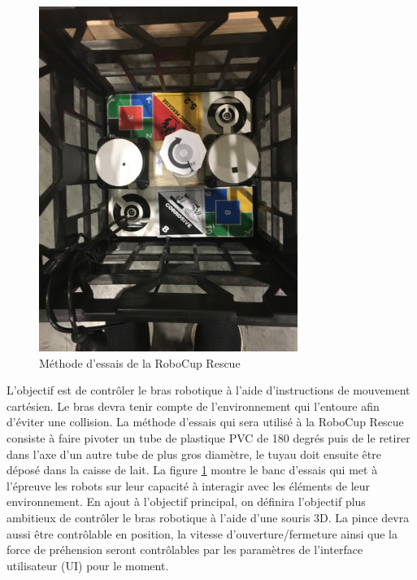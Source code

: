\begin{figure}
    \centering %
    \includegraphics[width=0.75\textwidth]{Figures/test_method_rrl.JPG}
    \caption{Méthode d'essais de la RoboCup Rescue}
    \label{fig:test_method_rrl}
\end{figure}

L'objectif est de contrôler le bras robotique à l'aide d'instructions de mouvement cartésien. 
Le bras devra tenir compte de l'environnement qui l'entoure afin d'éviter une collision. La méthode d'essais qui sera utilisé à la RoboCup Rescue consiste à faire pivoter un tube de plastique PVC de 180 degrés puis de le retirer dans l'axe d'un autre tube de plus gros diamètre, le tuyau doit ensuite être déposé dans la caisse de lait. La figure \ref{fig:test_method_rrl} montre le banc d'essais qui met à l'épreuve les robots sur leur capacité à interagir avec les éléments de leur environnement. 
En ajout à l'objectif principal, on définira l'objectif plus ambitieux de contrôler le bras robotique à l'aide d'une souris 3D. La pince devra aussi être contrôlable en position, la vitesse d'ouverture/fermeture ainsi que la force de préhension seront contrôlables par les paramètres de l'interface utilisateur (UI) pour le moment.

